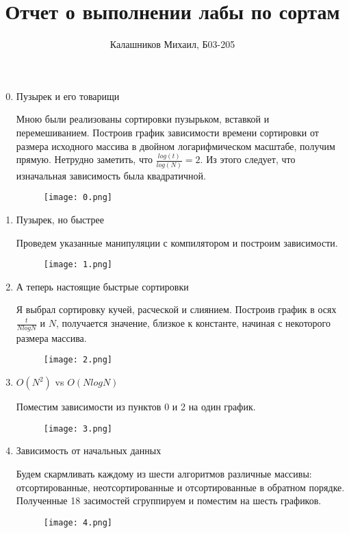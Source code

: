 \documentclass[14pt, a4paper]{article}
\title{\textbf{Отчет о выполнении лабы по сортам}}
\author{Калашников Михаил, Б03-205}
\date{}
\begin{document}
\maketitle

\begin{enumerate}
\setcounter{enumi}{-1}

\item Пузырек и его товарищи

Мною были реализованы сортировки пузырьком, вставкой и перемешиванием. Построив график зависимости времени сортировки от размера исходного массива в двойном логарифмическом масштабе, получим прямую. Нетрудно заметить, что $\frac{log(t)}{log(N)}=2$. Из этого следует, что изначальная зависимость была квадратичной.

\begin{figure}[!h]
\centering
\texttt{[image: 0.png]}
\label{image0}
\end{figure}

\clearpage
\item Пузырек, но быстрее

Проведем указанные манипуляции с компилятором и построим зависимости.

\begin{figure}[!h]
\centering
\texttt{[image: 1.png]}
\label{image1}
\end{figure}

\clearpage
\item А теперь настоящие быстрые сортировки

Я выбрал сортировку кучей, расческой и слиянием. Построив график в осях $\frac{t}{NlogN}$ и $N$, получается значение, близкое к константе, начиная с некоторого размера массива.

\begin{figure}[!h]
\centering
\texttt{[image: 2.png]}
\label{image2}
\end{figure}

\clearpage
\item $O(N^2)$ vs $O(NlogN)$

Поместим зависимости из пунктов 0 и 2 на один график.

\begin{figure}[!h]
\centering
\texttt{[image: 3.png]}
\label{image3}
\end{figure}

\clearpage
\item Зависимость от начальных данных

Будем скармливать каждому из шести алгоритмов различные массивы: отсортированные, неотсортированные и отсортированные в обратном порядке. Полученные 18 засимостей сгруппируем и поместим на шесть графиков.

\begin{figure}[!h]
\centering
\texttt{[image: 4.png]}
\label{image4}
\end{figure}


\end{enumerate}
\end{document}
